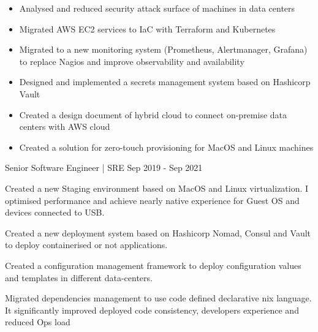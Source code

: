 \begin{cventries}
{\begin{itemize}
            \item {Analysed and reduced security attack surface of machines in data centers}
            \item {Migrated AWS EC2 services to IaC with Terraform and Kubernetes}
            \item {Migrated to a new monitoring system (Prometheus, Alertmanager, Grafana) to replace Nagios and improve observability and availability}
            \item {Designed and implemented a secrets management system based on Hashicorp Vault}
            \item {Created a design document of hybrid cloud to connect on-premise data centers with AWS cloud}
            \item {Created a solution for zero-touch provisioning for MacOS and Linux machines}
        \end{itemize}
    }

    \cventry
    {Senior Software Engineer | SRE} %
    {} %
    {} %
    {Sep 2019 - Sep 2021} %
    {
      \begin{cvitems} %
        \item {Created a new Staging environment based on MacOS and Linux virtualization. I optimised performance and achieve nearly native experience for Guest OS and devices connected to USB.}
        \item {Created a new deployment system based on Hashicorp Nomad, Consul and Vault to deploy containerised or not applications.}
        \item {Created a configuration management framework to deploy configuration values and templates in different data-centers.}
        \item {Migrated dependencies management to use code defined declarative nix language. It significantly improved deployed code consistency, developers experience and reduced Ops load}
      \end{cvitems}
    }


\end{cventries}
